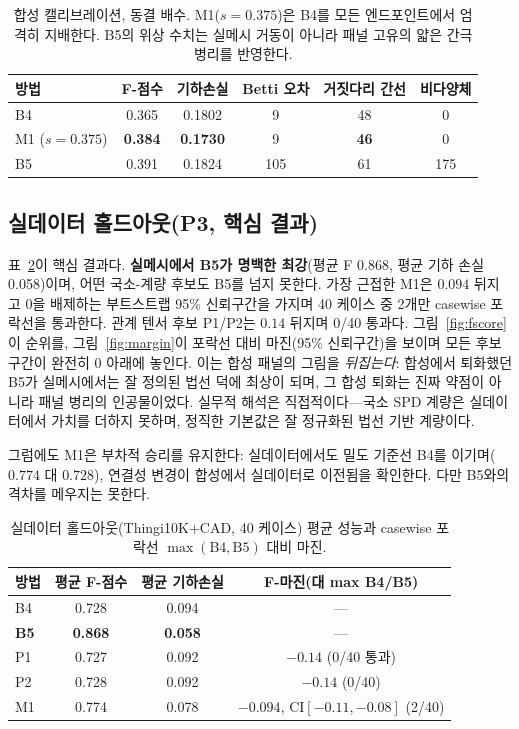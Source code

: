 \documentclass[11pt]{article}
\begin{document}
\begin{table}[t]\centering
\caption{합성 캘리브레이션, 동결 배수. M1($s{=}0.375$)은 B4를 모든 엔드포인트에서 엄격히
지배한다. B5의 위상 수치는 실메시 거동이 아니라 패널 고유의 얇은 간극 병리를 반영한다.}
\label{tab:m1syn}
\begin{tabular}{lccccc}
\toprule
방법 & F-점수 & 기하손실 & Betti 오차 & 거짓다리 간선 & 비다양체 \\
\midrule
B4              & 0.365 & 0.1802 & 9   & 48 & 0 \\
M1 ($s{=}0.375$) & \textbf{0.384} & \textbf{0.1730} & 9 & \textbf{46} & 0 \\
B5              & 0.391 & 0.1824 & 105 & 61 & 175 \\
\bottomrule
\end{tabular}
\end{table}

\subsection{실데이터 홀드아웃(P3, 핵심 결과)}
표~\ref{tab:p3}이 핵심 결과다. \textbf{실메시에서 B5가 명백한 최강}(평균 F 0.868, 평균 기하 손실
0.058)이며, 어떤 국소-계량 후보도 B5를 넘지 못한다. 가장 근접한 M1은 $0.094$ 뒤지고 0을 배제하는
부트스트랩 95\% 신뢰구간을 가지며 40 케이스 중 2개만 casewise 포락선을 통과한다. 관계 텐서 후보
P1/P2는 $0.14$ 뒤지며 0/40 통과다. 그림~\ref{fig:fscore}이 순위를, 그림~\ref{fig:margin}이 포락선
대비 마진(95\% 신뢰구간)을 보이며 모든 후보 구간이 완전히 0 아래에 놓인다. 이는 합성 패널의 그림을
\emph{뒤집는다}: 합성에서 퇴화했던 B5가 실메시에서는 잘 정의된 법선 덕에 최상이 되며, 그 합성 퇴화는
진짜 약점이 아니라 패널 병리의 인공물이었다. 실무적 해석은 직접적이다---국소 SPD 계량은 실데이터에서
가치를 더하지 못하며, 정직한 기본값은 잘 정규화된 법선 기반 계량이다.

그럼에도 M1은 부차적 승리를 유지한다: 실데이터에서도 밀도 기준선 B4를 이기며($0.774$ 대 $0.728$),
연결성 변경이 합성에서 실데이터로 이전됨을 확인한다. 다만 B5와의 격차를 메우지는 못한다.

\begin{table}[t]\centering
\caption{실데이터 홀드아웃(Thingi10K$+$CAD, 40 케이스) 평균 성능과 casewise 포락선
$\max(\text{B4},\text{B5})$ 대비 마진.}
\label{tab:p3}
\begin{tabular}{lccc}
\toprule
방법 & 평균 F-점수 & 평균 기하손실 & F-마진(대 max B4/B5) \\
\midrule
B4 & 0.728 & 0.094 & --- \\
\textbf{B5} & \textbf{0.868} & \textbf{0.058} & --- \\
P1 & 0.727 & 0.092 & $-0.14$ (0/40 통과) \\
P2 & 0.728 & 0.092 & $-0.14$ (0/40) \\
M1 & 0.774 & 0.078 & $-0.094$, CI$[-0.11,-0.08]$ (2/40) \\
\bottomrule
\end{tabular}
\end{table}
\end{document}
